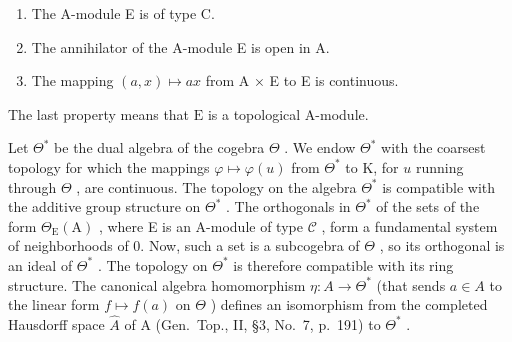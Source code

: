 \begin{enumerate}
\def\labelenumi{(\roman{enumi})}
\item
  The A-module E is of type C.
\item
  The annihilator of the A-module E is open in A.
\item
  The mapping \((a, x) \mapsto ax\) from A × E to E is continuous.
\end{enumerate}

The last property means that \(\mathrm{E}\) is a topological A-module.

Let \(\Theta^{*}\) be the dual algebra of the cogebra \(\Theta\) . We endow \(\Theta^{*}\) with the coarsest topology for which the mappings \(\varphi \mapsto \varphi(u)\) from \(\Theta^{*}\) to K, for \(u\) running through \(\Theta\) , are continuous. The topology on the algebra \(\Theta^{*}\) is compatible with the additive group structure on \(\Theta^{*}\) . The orthogonals in \(\Theta^{*}\) of the sets of the form \(\Theta_{\mathrm{E}}(\mathrm{A})\) , where E is an A-module of type \(\mathcal{C}\) , form a fundamental system of neighborhoods of 0. Now, such a set is a subcogebra of \(\Theta\) , so its orthogonal is an ideal of \(\Theta^{*}\) . The topology on \(\Theta^{*}\) is therefore compatible with its ring structure. The canonical algebra homomorphism \(\eta: A \to \Theta^{*}\) (that sends \(a \in A\) to the linear form \(f \mapsto f(a)\) on \(\Theta\) ) defines an isomorphism from the completed Hausdorff space \(\widehat{A}\) of A (Gen.~Top., II, §3, No.~7, p.~191) to \(\Theta^{*}\) .


